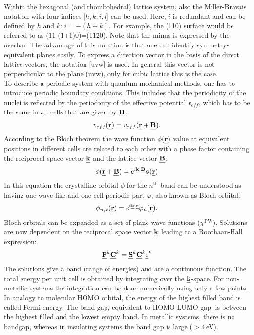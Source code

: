 \documentclass[11pt,DIV=13,BCOR=5mm,a4paper,headinclude]{scrbook}
\def\mathbi#1{\textbf{\em #1}}
\renewcommand{\vec}[1]{\mathbi{#1}}
\begin{document}
\\
Within the hexagonal (and rhombohedral) lattice system, also the Miller-Bravais notation with four indices [$h,k,i,l$] can be used.
Here, $i$ is redundant and can be defined by $h$ and $k$: $i=-(h+k)$.
For example, the (110) surface would be referred to as (11-(1+1)0)=(11\=20).
Note that the minus is expressed by the overbar.
The advantage of this notation is that one can identify symmetry-equivalent planes easily.
To express a direction vector in the basis of the direct lattice vectors, the notation [uvw] is used.
In general this vector is not perpendicular to the plane (uvw), only for cubic lattice this is the case.
\\

To describe a periodic system with quantum mechanical methods, one has to introduce periodic boundary conditions.
This includes that the periodicity of the nuclei is reflected by the periodicity of the effective potential $v_{eff}$, which has to be the same in all cells that are given by $\vec{B}$:
\begin{equation}
 v_{eff}(\vec{r})= v_{eff}(\vec{r}+\vec{B}).
\end{equation}
According to the Bloch theorem the wave function $\phi(\vec{r})$ value at equivalent positions in different cells are related to each other with a phase factor containing the reciprocal space vector $\vec{k}$ and the lattice vector $\vec{B}$:
\begin{equation}
 \phi(\vec{r} + \vec{B})=e^{i\vec{k}\cdot\vec{B}}\phi(\vec{r})
\end{equation}
In this equation the crystalline orbital $\phi$ for the $n^\textrm{th}$ band can be understood as having one wave-like and one cell periodic part $\varphi$, also known as Bloch orbital:
\begin{equation}
 \phi_{n,k}(\vec{r})=e^{i\vec{k}\cdot\vec{r}}\varphi_n(\vec{r}).
\end{equation}
Bloch orbitals can be expanded as a set of plane wave functions ($\chi^\textrm{PW}$).
Solutions are now dependent on the reciprocal space vector $\vec{k}$ leading to a Roothaan-Hall expression:
\begin{equation}
 \vec{F}^k\vec{C}^k=\vec{S}^k\vec{C}^k\vec{$\varepsilon$}^k
\end{equation}
The solutions give a band (range of energies) and are a continuous function.
The total energy per unit cell is obtained by integrating over the $\vec{k}$-space.
For non-metallic systems the integration can be done numerically using only a few points\cite{monkhorst}.
In analogy to molecular HOMO orbital, the energy of the highest filled band is called Fermi energy.
The band gap, equivalent to HOMO-LUMO gap, is between the highest filled and the lowest empty band.
In metallic systems, there is no bandgap, whereas in insulating systems the band gap is large ($>4\,$eV\cite{holleman2007lehrbuch}).
\\
\end{document}
